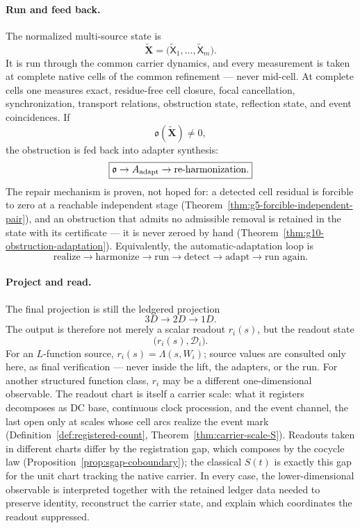 \documentclass[11pt]{article}
\theoremstyle{definition}
\begin{document}
\paragraph{Run and feed back.}
The normalized multi-source state is
\[
\widetilde{\mathbf X}
=
\bigl(
\widetilde{\mathsf X}_1,\ldots,\widetilde{\mathsf X}_m
\bigr).
\]
It is run through the common carrier dynamics, and every measurement is taken
at complete native cells of the common refinement --- never mid-cell.  At
complete cells one measures exact, residue-free cell closure, focal
cancellation, synchronization, transport relations, obstruction state,
reflection state, and event coincidences.  If
\[
\mathfrak o(\widetilde{\mathbf X})\neq0,
\]
the obstruction is fed back into adapter synthesis:
\[
\boxed{
\mathfrak o
\to
A_{\rm adapt}
\to
\text{re-harmonization}.
}
\]
The repair mechanism is proven, not hoped for: a detected cell residual is
forcible to zero at a reachable independent stage
(Theorem~\ref{thm:g5-forcible-independent-pair}), and an obstruction that
admits no admissible removal is retained in the state with its certificate
--- it is never zeroed by hand (Theorem~\ref{thm:g10-obstruction-adaptation}).
Equivalently, the automatic-adaptation loop is
\[
\boxed{
\text{realize}
\to
\text{harmonize}
\to
\text{run}
\to
\text{detect}
\to
\text{adapt}
\to
\text{run again}.
}
\]

\paragraph{Project and read.}
The final projection is still the ledgered projection
\[
3D\to2D\to1D.
\]
The output is therefore not merely a scalar readout \(r_i(s)\), but the
readout state
\[
\boxed{
\bigl(r_i(s),\mathcal D_i\bigr).
}
\]
For an \(L\)-function source, \(r_i(s)=\Lambda(s,W_i)\); source values are
consulted only here, as final verification --- never inside the lift, the
adapters, or the run.  For another structured function class, \(r_i\) may be
a different one-dimensional observable.  The readout chart is itself a
carrier scale: what it registers decomposes as DC base, continuous clock
procession, and the event channel, the last open only at scales whose cell
arcs realize the event mark (Definition~\ref{def:registered-count},
Theorem~\ref{thm:carrier-scale-S}).  Readouts taken in different charts
differ by the registration gap, which composes by the cocycle law
(Proposition~\ref{prop:sgap-coboundary}); the classical \(S(t)\) is exactly
this gap for the unit chart tracking the native carrier.  In every case, the
lower-dimensional observable is interpreted together with the retained ledger
data needed to preserve identity, reconstruct the carrier state, and explain
which coordinates the readout suppressed.
\end{document}
